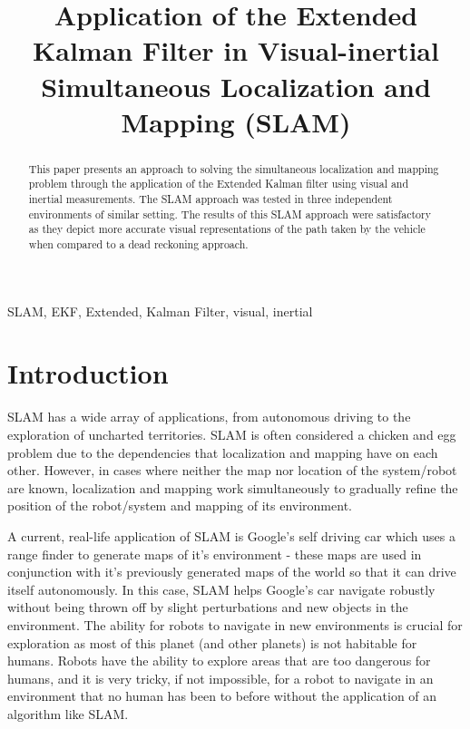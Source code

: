 \documentclass[conference]{IEEEtran}
\begin{document}
\title{Application of the Extended Kalman Filter in Visual-inertial Simultaneous Localization and Mapping (SLAM)}


\author{
}

\maketitle

\begin{abstract}
This paper presents an approach to solving the simultaneous localization and mapping problem through the application of the Extended Kalman filter using visual and inertial measurements. The SLAM approach was tested in three independent environments of similar setting. The results of this SLAM approach were satisfactory as they depict more accurate visual representations of the path taken by the vehicle when compared to a dead reckoning approach.
\end{abstract}

\begin{IEEEkeywords}
SLAM, EKF, Extended, Kalman Filter, visual, inertial
\end{IEEEkeywords}

\section{Introduction}

SLAM has a wide array of applications, from autonomous driving to the exploration of uncharted territories. SLAM is often considered a chicken and egg problem due to the dependencies that localization and mapping have on each other. However, in cases where neither the map nor location of the system/robot are known, localization and mapping work simultaneously to gradually refine the position of the robot/system and mapping of its environment. 

A current, real-life application of SLAM is Google's self driving car which uses a range finder to generate maps of it's environment - these maps are used in conjunction with it's previously generated maps of the world so that it can drive itself autonomously. In this case, SLAM helps Google's car navigate robustly without being thrown off by slight perturbations and new objects in the environment. The ability for robots to navigate in new environments is crucial for exploration as most of this planet (and other planets) is not habitable for humans. Robots have the ability to explore areas that are too dangerous for humans, and it is very tricky, if not impossible, for a robot to navigate in an environment that no human has been to before without the application of an algorithm like SLAM.
\end{document}
